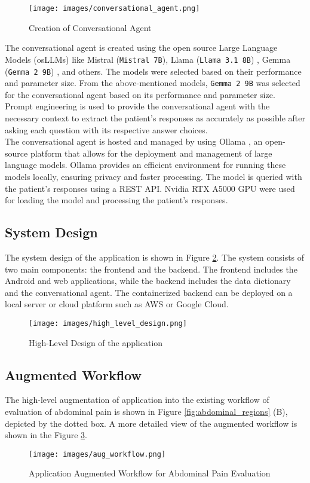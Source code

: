 \begin{figure}[H]
    \centering
    \texttt{[image: images/conversational\_agent.png]}
    \caption{Creation of Conversational Agent}
    \label{fig:conversational_agent}
\end{figure}

\noindent The conversational agent is created using the open source Large Language Models (osLLMs) like Mistral (\texttt{Mistral 7B})\cite{jiang2023mistral}, Llama (\texttt{Llama 3.1 8B}) \cite{dubey2024llama}, Gemma (\texttt{Gemma 2 9B}) \cite{team2024gemma}, and others. The models were selected based on their performance and parameter size. From the above-mentioned models, \texttt{Gemma 2 9B} was selected for the conversational agent based on its performance and parameter size. Prompt engineering \cite{liu2023pre} is used to provide the conversational agent with the necessary context to extract the patient's responses as accurately as possible after asking each question with its respective answer choices. \\[\baselineskip]

\noindent The conversational agent is hosted and managed by using Ollama \cite{ollama}, an open-source platform that allows for the deployment and management of large language models. Ollama provides an efficient environment for running these models locally, ensuring privacy and faster processing. The model is queried with the patient's responses using a REST API. Nvidia RTX A5000 GPU were used for loading the model and processing the patient's responses.

\subsection{System Design}
The system design of the application is shown in Figure \ref{fig:high_level_design}. The system consists of two main components: the frontend and the backend. The frontend includes the Android and web applications, while the backend includes the data dictionary and the conversational agent. The containerized backend can be deployed on a local server or cloud platform such as AWS or Google Cloud.
\begin{figure}[H]
    \centering
    \texttt{[image: images/high\_level\_design.png]}
    \caption{High-Level Design of the application}
    \label{fig:high_level_design}
\end{figure}

\subsection{Augmented Workflow}
The high-level augmentation of application into the existing workflow of evaluation of abdominal pain is shown in Figure \ref{fig:abdominal_regions} (B), depicted by the dotted box. A more detailed view of the augmented workflow is shown in the Figure \ref{fig:aug_workflow}.
\begin{figure}[H]
    \centering
    \texttt{[image: images/aug\_workflow.png]}
    \caption{Application Augmented Workflow for Abdominal Pain Evaluation}
    \label{fig:aug_workflow}
\end{figure}

